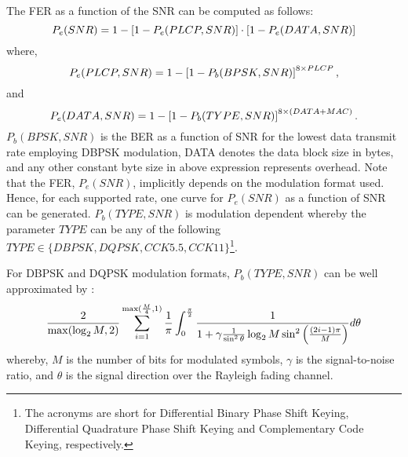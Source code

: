 \documentclass[10pt,onecolumn,a4paper]{IEEEtran}
\begin{document}
The FER as a function of the SNR can be computed as follows:
\begin{equation}\label{fer_1}\small
P_e(SNR)=1-\left[1-P_e(PLCP,SNR)\right]\cdot
\left[1-P_e(DATA,SNR)\right]
\end{equation}
where,
\begin{equation}\label{fer_2}\small
P_e(PLCP,SNR)=1-\left[1-P_b(BPSK,SNR)\right]^{8\times PLCP},
\end{equation}
and
\begin{equation}\label{fer_3}\small
P_e(DATA,SNR)=1-\left[1-P_b(TYPE,SNR)\right]^{8\times (DATA+MAC)}.
\end{equation}
$P_b(BPSK,SNR)$ is the BER as a function of SNR for the lowest
data transmit rate employing DBPSK modulation, DATA denotes the
data block size in bytes, and any other constant byte size in
above expression represents overhead. Note that the FER,
$P_e(SNR)$, implicitly depends on the modulation format used.
Hence, for each supported rate, one curve for $P_e(SNR)$ as a
function of SNR can be generated. $P_b(TYPE,SNR)$ is modulation
dependent whereby the parameter $TYPE$ can be any of the following
$TYPE\in \{DBPSK,DQPSK,CCK5.5,CCK11\}$\footnote{The acronyms are
short for Differential Binary Phase Shift Keying, Differential
Quadrature Phase Shift Keying and Complementary Code Keying,
respectively.}.

For DBPSK and DQPSK modulation formats, $P_b(TYPE,SNR)$ can be
well approximated by \cite{SimonAlouini}:
\begin{equation}\small
\label{ber_function}
\frac{2}{\max(\log_{2}M,2)}\sum_{i=1}^{\max(\frac{M}{4},1)}\frac{1}{\pi}\int_{0}^{\frac{\pi}{2}}
\frac{1}{1+\gamma\frac{1}{\sin^2\theta}\log_{2}M\sin^2\left(\frac{(2i-1)\pi}{M}\right)}d\theta
\end{equation}
whereby, $M$ is the number of bits for modulated symbols, $\gamma$
is the signal-to-noise ratio, and $\theta$ is the signal direction
over the Rayleigh fading channel.
\end{document}
